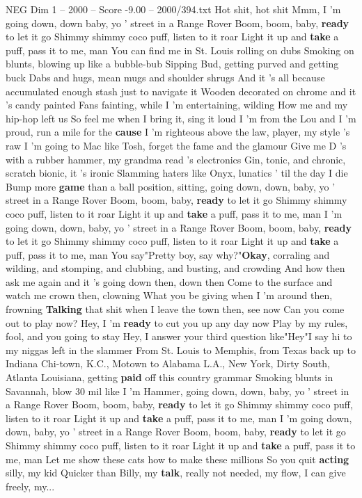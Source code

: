 \begin{textsample}{NEG Dim 1 – 2000 – Score -9.00 – 2000/394.txt}  \label{ex:f1_neg_008}
Hot shit, hot shit Mmm, I 'm going down, down baby, yo ' street in a Range Rover Boom, boom, baby, \textbf{ready} to let it go Shimmy shimmy coco puff, listen to it roar Light it up and \textbf{take} a puff, pass it to me, man You can find me in St.
Louis rolling on dubs Smoking on blunts, blowing up like a bubble-bub Sipping Bud, getting purved and getting buck Dabs and hugs, mean mugs and shoulder shrugs And it 's all because accumulated enough stash just to navigate it Wooden decorated on chrome and it 's candy painted Fans fainting, while I 'm entertaining, wilding How me and my hip-hop left us So feel me when I bring it, sing it loud I 'm from the Lou and I 'm proud, run a mile for the \textbf{cause} I 'm righteous above the law, player, my style 's raw I 'm going to Mac like Tosh, forget the fame and the glamour Give me D 's with a rubber hammer, my grandma read 's electronics Gin, tonic, and chronic, scratch bionic, it 's ironic Slamming haters like Onyx, lunatics ' til the day I die Bump more \textbf{game} than a ball position, sitting, going down, down, baby, yo ' street in a Range Rover Boom, boom, baby, \textbf{ready} to let it go Shimmy shimmy coco puff, listen to it roar Light it up and \textbf{take} a puff, pass it to me, man I 'm going down, down, baby, yo ' street in a Range Rover Boom, boom, baby, \textbf{ready} to let it go Shimmy shimmy coco puff, listen to it roar Light it up and \textbf{take} a puff, pass it to me, man You say"Pretty boy, say why?"\textbf{Okay}, corraling and wilding, and stomping, and clubbing, and busting, and crowding And how then ask me again and it 's going down then, down then Come to the surface and watch me crown then, clowning What you be giving when I 'm around then, frowning \textbf{Talking} that shit when I leave the town then, see now Can you come out to play now?
Hey, I 'm \textbf{ready} to cut you up any day now Play by my rules, fool, and you going to stay Hey, I answer your third question like"Hey"I say hi to my niggas left in the slammer From St.
Louis to Memphis, from Texas back up to Indiana Chi-town, K.C., Motown to Alabama L.A., New York, Dirty South, Atlanta Louisiana, getting \textbf{paid} off this country grammar Smoking blunts in Savannah, blow 30 mil like I 'm Hammer, going down, down, baby, yo ' street in a Range Rover Boom, boom, baby, \textbf{ready} to let it go Shimmy shimmy coco puff, listen to it roar Light it up and \textbf{take} a puff, pass it to me, man I 'm going down, down, baby, yo ' street in a Range Rover Boom, boom, baby, \textbf{ready} to let it go Shimmy shimmy coco puff, listen to it roar Light it up and \textbf{take} a puff, pass it to me, man Let me show these cats how to make these millions So you quit \textbf{acting} silly, my kid Quicker than Billy, my \textbf{talk}, really not needed, my flow, I can give freely, my...

\end{textsample}
